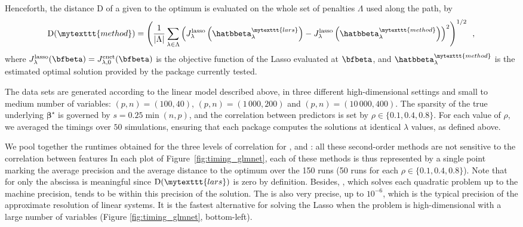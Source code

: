   Henceforth, the  distance $\mathrm{D}$  of a given   to
  the optimum is evaluated on  the whole set of penalties $\Lambda$ used
  along the path, by
  \begin{equation*}
    \mathrm{D}(\mytexttt{method}) = \left( \frac{1}{|\Lambda|}\sum_{\lambda\in\Lambda}
      \left(J_{\lambda}^{\text{lasso}}\left(\hatbbeta_\lambda^{\mytexttt{lars}}\right)
        -J_{\lambda}^{\text{lasso}}\left(\hatbbeta_\lambda^{\mytexttt{method}}\right)\right)^2
       \right)^{1/2} 
    \enspace,
  \end{equation*}
  where $J_{\lambda}^{\text{lasso}}(\bfbeta) = J_{\lambda,0}^{\text{enet}}(\bfbeta)$ 
  is the objective function of the Lasso evaluated at $\bfbeta$, and
  $\hatbbeta_\lambda^{\mytexttt{method}}$ is the estimated optimal solution
  provided by the  package currently tested.
\fi

The data  sets are  generated according to  the linear  model described
above, in three different high-dimensional settings and small to medium number 
of variables: 
$(p,n)=(100,40)$, $(p,n)=(1\,000,200)$ and $(p,n)=(10\,000,400)$.  
The sparsity of the true underlying $\boldsymbol\beta^\star$ is governed by $s =
0.25\min(n,p)$, and the correlation between predictors is set by $\rho\in\{0.1, 0.4,  0.8\}$. For  each  value of
$\rho$, we averaged the timings over $50$ simulations, ensuring that each package
computes the solutions at identical $\lambda$ values, as defined above.

\iflong

  We pool together the runtimes obtained for the three levels of correlation for
  ,  and : all these 
  second-order methods are not sensitive to the correlation between features
  In each plot of Figure~\ref{fig:timing_glmnet}, each of these methods is thus 
  represented by a single point marking the average precision and the average distance to the
  optimum over the 150 runs (50 runs for each $\rho \in \{0.1, 0.4, 0.8\}$).
  Note that for  only the abscissa is meaningful since
  $\mathrm{D}(\mytexttt{lars})$ is zero by definition.
  Besides, , which solves each quadratic problem up to the
  machine precision, tends to be within this precision of the 
  solution.%
  The  is also very precise, up to $10^{-6}$,
  which is the typical precision of the approximate resolution of linear systems.
  It is the fastest alternative for solving the Lasso when the problem is
  high-dimensional with a large number of variables (Figure
  \ref{fig:timing_glmnet}, bottom-left).

